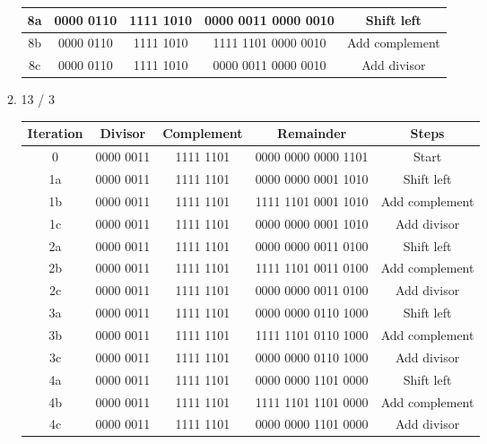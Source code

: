 \documentclass[12pt]{article}
\begin{document}
\begin{enumerate}
\begin{enumerate}
\begin{center}
\begin{tabular}{|c|c|c|c|c|}
        8a & 0000 0110 & 1111 1010 & 0000 0011 0000 0010 & Shift left \\
        \hline
        8b & 0000 0110 & 1111 1010 & 1111 1101 0000 0010 & Add complement \\
        \hline
        8c & 0000 0110 & 1111 1010 & 0000 0011 0000 0010 & Add divisor \\
        \hline
      \end{tabular}
      \end{center}
      \clearpage

      \item 13 / 3
      \begin{center}
      \begin{tabular}{|c|c|c|c|c|} 
        \hline
        \textbf{Iteration} & \textbf{Divisor} & \textbf{Complement} & \textbf{Remainder} & \textbf{Steps} \\ 
        \hline
        0 & 0000 0011 & 1111 1101 & 0000 0000 0000 1101 & Start \\
        \hline

        1a & 0000 0011 & 1111 1101 & 0000 0000 0001 1010 & Shift left \\
        \hline
        1b & 0000 0011 & 1111 1101 & 1111 1101 0001 1010 & Add complement \\
        \hline
        1c & 0000 0011 & 1111 1101 & 0000 0000 0001 1010 & Add divisor \\
        \hline

        2a & 0000 0011 & 1111 1101 & 0000 0000 0011 0100 & Shift left \\
        \hline
        2b & 0000 0011 & 1111 1101 & 1111 1101 0011 0100 & Add complement \\
        \hline
        2c & 0000 0011 & 1111 1101 & 0000 0000 0011 0100 & Add divisor \\
        \hline

        3a & 0000 0011 & 1111 1101 & 0000 0000 0110 1000 & Shift left \\
        \hline
        3b & 0000 0011 & 1111 1101 & 1111 1101 0110 1000 & Add complement \\
        \hline
        3c & 0000 0011 & 1111 1101 & 0000 0000 0110 1000 & Add divisor \\
        \hline

        4a & 0000 0011 & 1111 1101 & 0000 0000 1101 0000 & Shift left \\
        \hline
        4b & 0000 0011 & 1111 1101 & 1111 1101 1101 0000 & Add complement \\
        \hline
        4c & 0000 0011 & 1111 1101 & 0000 0000 1101 0000 & Add divisor \\
        \hline


\end{tabular}
\end{center}
\end{enumerate}
\end{enumerate}
\end{document}
